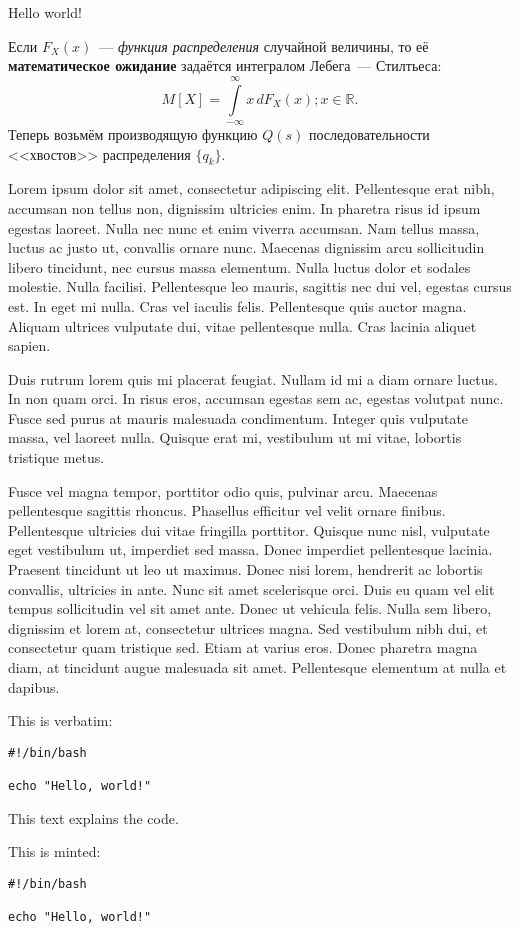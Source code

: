 Hello world!

Если $F_X(x)$~--- \emph{функция распределения} случайной величины, то её \textbf{математическое ожидание} задаётся интегралом Лебега~--- Стилтьеса:
$$
M[X]=\int\limits_{-\infty}^{\infty}\!x\, dF_X(x);  x \in \mathbb R.
$$
Теперь возьмём производящую функцию $Q(s)$ последовательности <<хвостов>> распределения $\{q_k\}$.

Lorem ipsum dolor sit amet, consectetur adipiscing elit. Pellentesque erat nibh, accumsan non tellus non, dignissim ultricies enim. In pharetra risus id ipsum egestas laoreet. Nulla nec nunc et enim viverra accumsan. Nam tellus massa, luctus ac justo ut, convallis ornare nunc. Maecenas dignissim arcu sollicitudin libero tincidunt, nec cursus massa elementum. Nulla luctus dolor et sodales molestie. Nulla facilisi. Pellentesque leo mauris, sagittis nec dui vel, egestas cursus est. In eget mi nulla. Cras vel iaculis felis. Pellentesque quis auctor magna. Aliquam ultrices vulputate dui, vitae pellentesque nulla. Cras lacinia aliquet sapien.

Duis rutrum lorem quis mi placerat feugiat. Nullam id mi a diam ornare luctus. In non quam orci. In risus eros, accumsan egestas sem ac, egestas volutpat nunc. Fusce sed purus at mauris malesuada condimentum. Integer quis vulputate massa, vel laoreet nulla. Quisque erat mi, vestibulum ut mi vitae, lobortis tristique metus.

Fusce vel magna tempor, porttitor odio quis, pulvinar arcu. Maecenas pellentesque sagittis rhoncus. Phasellus efficitur vel velit ornare finibus. Pellentesque ultricies dui vitae fringilla porttitor. Quisque nunc nisl, vulputate eget vestibulum ut, imperdiet sed massa. Donec imperdiet pellentesque lacinia. Praesent tincidunt ut leo ut maximus. Donec nisi lorem, hendrerit ac lobortis convallis, ultricies in ante. Nunc sit amet scelerisque orci. Duis eu quam vel elit tempus sollicitudin vel sit amet ante. Donec ut vehicula felis. Nulla sem libero, dignissim et lorem at, consectetur ultrices magna. Sed vestibulum nibh dui, et consectetur quam tristique sed. Etiam at varius eros. Donec pharetra magna diam, at tincidunt augue malesuada sit amet. Pellentesque elementum at nulla et dapibus.

This is verbatim:
\begin{verbatim}
#!/bin/bash

echo "Hello, world!"
\end{verbatim}
This text explains the code.

This is minted:
\begin{verbatim}
#!/bin/bash

echo "Hello, world!"
\end{verbatim}

